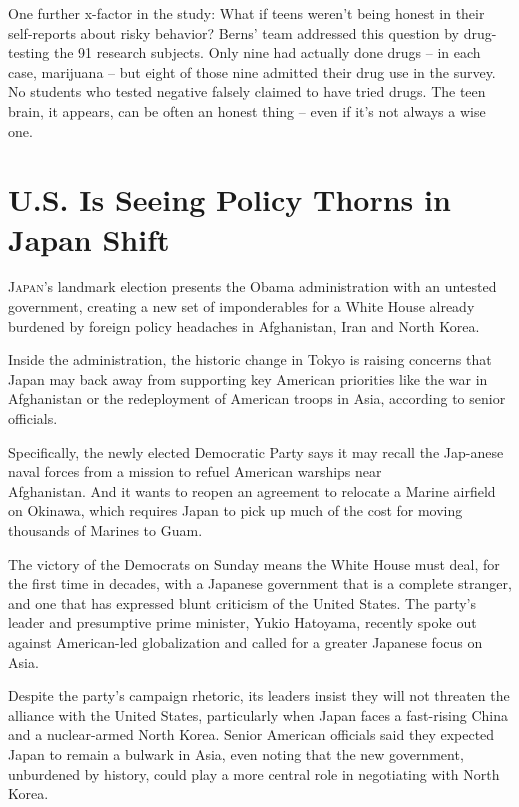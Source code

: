 ﻿\documentclass[12pt]{article}
\begin{document}
One further x-factor in the study: What if teens weren't being honest in their self-reports about
risky behavior? Berns' team addressed this question by drug-testing the 91 research subjects. Only
nine had actually done drugs -- in each case, marijuana -- but eight of those nine admitted their
drug use in the survey. No students who tested negative falsely claimed to have tried drugs. The
teen brain, it appears, can be often an honest thing -- even if it's not always a wise one.

\section{U.S. Is Seeing Policy Thorns\cite{thorn} in Japan Shift}

\lettrine{J}{apan}'s landmark election presents the Obama administration with an untested
government, creating a new set of imponderables for a White House already burdened by foreign policy
headaches in Afghanistan, Iran and North Korea.

Inside the administration, the historic change in Tokyo is raising concerns that Japan may back away
from supporting key American priorities like the war in Afghanistan or the redeployment of American
troops in Asia, according to senior officials.

Specifically, the newly elected Democratic Party says it may recall the Jap-anese naval forces from a
mission to refuel American warships near\\Afghanistan. And it wants to reopen an agreement to
relocate a Marine airfield on Okinawa, which requires Japan to pick up much of the cost for moving
thousands of Marines to Guam.

The victory of the Democrats on Sunday means the White House must deal, for the first time in
decades, with a Japanese government that is a complete stranger, and one that has expressed
blunt\cite{blunt} criticism of the United States. The party's leader and presumptive prime minister,
Yukio Hatoyama, recently spoke out against American-led globalization and called for a greater
Japanese focus on Asia.

Despite the party's campaign rhetoric, its leaders insist they will not threaten the alliance with
the United States, particularly when Japan faces a fast-rising China and a nuclear-armed North
Korea. Senior American officials said they expected Japan to remain a bulwark in Asia, even noting
that the new government, unburdened by history, could play a more central role in negotiating with
North Korea.
\end{document}
